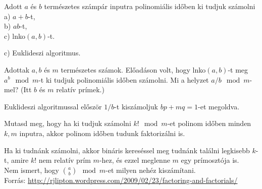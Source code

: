 \begin{Exercise}[counter={sorszam}, difficulty=0]
	Adott $a$ \'es $b$ term\'eszetes sz\'amp\'ar inputra polinomi\'alis id\H oben ki tudjuk sz\'amolni\\
	a) $a+b$-t,\\
	b) $ab$-t,\\
	c) lnko$(a,b)$-t.
\end{Exercise}	
\begin{Answer}
	c) Euklideszi algoritmus.
\end{Answer}

\begin{Exercise}[counter={sorszam}, difficulty=0]
	Adottak $a, b$ \'es $m$ term\'eszetes sz\'amok.
	El\H oad\'ason volt, hogy lnko$(a,b)$-t meg $a^b \mod m$-t ki tudjuk polinomi\'alis id\H oben sz\'amolni.
	Mi a helyzet $a/b \mod m$-mel? (Itt $b$ \'es $m$ relat\'iv pr\'imek.)
\end{Exercise}	
\begin{Answer}
	Euklideszi algoritmussal el\H osz\"or $1/b$-t kisz\'amoljuk $bp + mq = 1$-et megoldva.
\end{Answer}

\begin{Exercise}[counter={sorszam}, difficulty=0]
	Mutasd meg, hogy ha ki tudjuk sz\'amolni $k! \mod m$-et polinom id\H oben minden $k, m$ inputra, akkor polinom id\H oben tudunk faktoriz\'alni is.
\end{Exercise}	
\begin{Answer}
	Ha ki tudn\'ank sz\'amolni, akkor bin\'aris keres\'essel meg tudn\'ank tal\'alni legkisebb $k$-t, amire $k!$ nem relat\'iv pr\'im $m$-hez, \'es ezzel meglenne $m$ egy pr\'imoszt\'oja is.\\
	Nem ismert, hogy ${a \choose b} \mod m$-et milyen neh\'ez kisz\'am\'itani.\\
	Forr\'as: \url{http://rjlipton.wordpress.com/2009/02/23/factoring-and-factorials/}
\end{Answer}


